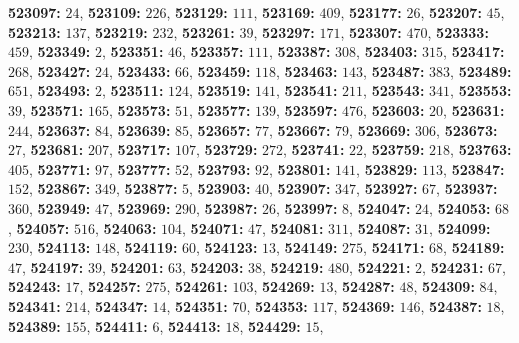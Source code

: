 \textsf{\bfseries 523097:} $24$, \textsf{\bfseries 523109:} $226$, \textsf{\bfseries 523129:} $111$, \textsf{\bfseries 523169:} $409$, \textsf{\bfseries 523177:} $26$, \textsf{\bfseries 523207:} $45$, \textsf{\bfseries 523213:} $137$, \textsf{\bfseries 523219:} $232$, \textsf{\bfseries 523261:} $39$, \textsf{\bfseries 523297:} $171$, \textsf{\bfseries 523307:} $470$, \textsf{\bfseries 523333:} $459$, \textsf{\bfseries 523349:} $2$, \textsf{\bfseries 523351:} $46$, \textsf{\bfseries 523357:} $111$, \textsf{\bfseries 523387:} $308$, \textsf{\bfseries 523403:} $315$, \textsf{\bfseries 523417:} $268$, \textsf{\bfseries 523427:} $24$, \textsf{\bfseries 523433:} $66$, \textsf{\bfseries 523459:} $118$, \textsf{\bfseries 523463:} $143$, \textsf{\bfseries 523487:} $383$, \textsf{\bfseries 523489:} $651$, \textsf{\bfseries 523493:} $2$, \textsf{\bfseries 523511:} $124$, \textsf{\bfseries 523519:} $141$, \textsf{\bfseries 523541:} $211$, \textsf{\bfseries 523543:} $341$, \textsf{\bfseries 523553:} $39$, \textsf{\bfseries 523571:} $165$, \textsf{\bfseries 523573:} $51$, \textsf{\bfseries 523577:} $139$, \textsf{\bfseries 523597:} $476$, \textsf{\bfseries 523603:} $20$, \textsf{\bfseries 523631:} $244$, \textsf{\bfseries 523637:} $84$, \textsf{\bfseries 523639:} $85$, \textsf{\bfseries 523657:} $77$, \textsf{\bfseries 523667:} $79$, \textsf{\bfseries 523669:} $306$, \textsf{\bfseries 523673:} $27$, \textsf{\bfseries 523681:} $207$, \textsf{\bfseries 523717:} $107$, \textsf{\bfseries 523729:} $272$, \textsf{\bfseries 523741:} $22$, \textsf{\bfseries 523759:} $218$, \textsf{\bfseries 523763:} $405$, \textsf{\bfseries 523771:} $97$, \textsf{\bfseries 523777:} $52$, \textsf{\bfseries 523793:} $92$, \textsf{\bfseries 523801:} $141$, \textsf{\bfseries 523829:} $113$, \textsf{\bfseries 523847:} $152$, \textsf{\bfseries 523867:} $349$, \textsf{\bfseries 523877:} $5$, \textsf{\bfseries 523903:} $40$, \textsf{\bfseries 523907:} $347$, \textsf{\bfseries 523927:} $67$, \textsf{\bfseries 523937:} $360$, \textsf{\bfseries 523949:} $47$, \textsf{\bfseries 523969:} $290$, \textsf{\bfseries 523987:} $26$, \textsf{\bfseries 523997:} $8$, \textsf{\bfseries 524047:} $24$, \textsf{\bfseries 524053:} $68$, \textsf{\bfseries 524057:} $516$, \textsf{\bfseries 524063:} $104$, \textsf{\bfseries 524071:} $47$, \textsf{\bfseries 524081:} $311$, \textsf{\bfseries 524087:} $31$, \textsf{\bfseries 524099:} $230$, \textsf{\bfseries 524113:} $148$, \textsf{\bfseries 524119:} $60$, \textsf{\bfseries 524123:} $13$, \textsf{\bfseries 524149:} $275$, \textsf{\bfseries 524171:} $68$, \textsf{\bfseries 524189:} $47$, \textsf{\bfseries 524197:} $39$, \textsf{\bfseries 524201:} $63$, \textsf{\bfseries 524203:} $38$, \textsf{\bfseries 524219:} $480$, \textsf{\bfseries 524221:} $2$, \textsf{\bfseries 524231:} $67$, \textsf{\bfseries 524243:} $17$, \textsf{\bfseries 524257:} $275$, \textsf{\bfseries 524261:} $103$, \textsf{\bfseries 524269:} $13$, \textsf{\bfseries 524287:} $48$, \textsf{\bfseries 524309:} $84$, \textsf{\bfseries 524341:} $214$, \textsf{\bfseries 524347:} $14$, \textsf{\bfseries 524351:} $70$, \textsf{\bfseries 524353:} $117$, \textsf{\bfseries 524369:} $146$, \textsf{\bfseries 524387:} $18$, \textsf{\bfseries 524389:} $155$, \textsf{\bfseries 524411:} $6$, \textsf{\bfseries 524413:} $18$, \textsf{\bfseries 524429:} $15$, 
